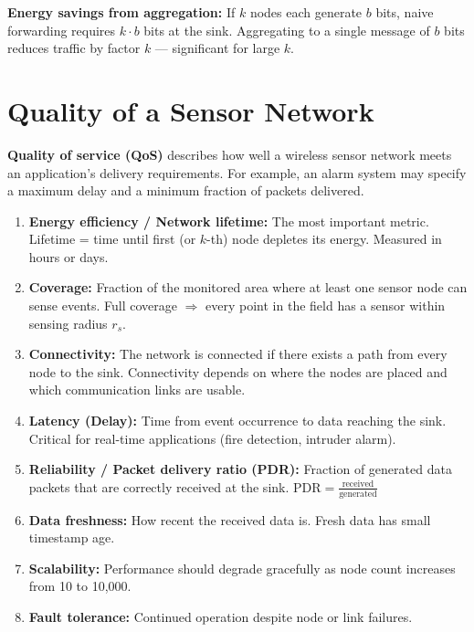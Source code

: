 \documentclass[12pt,a4paper]{article}
\begin{document}
\textbf{Energy savings from aggregation:} If $k$ nodes each generate $b$ bits, naive forwarding requires $k \cdot b$ bits at the sink. Aggregating to a single message of $b$ bits reduces traffic by factor $k$ --- significant for large $k$.

\section{Quality of a Sensor Network}

\begin{tcolorbox}[defbox, title={Quality of Service in Sensor Networks}]
\textbf{Quality of service (QoS)} describes how well a wireless sensor network meets an application's delivery requirements. For example, an alarm system may specify a maximum delay and a minimum fraction of packets delivered.
\end{tcolorbox}

\begin{tcolorbox}[formulabox, title={\textbf{QoS Metrics for WSN}}]
\begin{enumerate}[leftmargin=*, itemsep=5pt]
  \item \textbf{Energy efficiency / Network lifetime:} The most important metric. Lifetime = time until first (or $k$-th) node depletes its energy. Measured in hours or days.

  \item \textbf{Coverage:} Fraction of the monitored area where at least one sensor node can sense events. Full coverage $\Rightarrow$ every point in the field has a sensor within sensing radius $r_s$.

  \item \textbf{Connectivity:} The network is connected if there exists a path from every node to the sink. Connectivity depends on where the nodes are placed and which communication links are usable.

  \item \textbf{Latency (Delay):} Time from event occurrence to data reaching the sink. Critical for real-time applications (fire detection, intruder alarm).

  \item \textbf{Reliability / Packet delivery ratio (PDR):} Fraction of generated data packets that are correctly received at the sink. $\text{PDR} = \frac{\text{received}}{\text{generated}}$

  \item \textbf{Data freshness:} How recent the received data is. Fresh data has small timestamp age.

  \item \textbf{Scalability:} Performance should degrade gracefully as node count increases from 10 to 10,000.

  \item \textbf{Fault tolerance:} Continued operation despite node or link failures.
\end{enumerate}
\end{tcolorbox}
\end{document}
